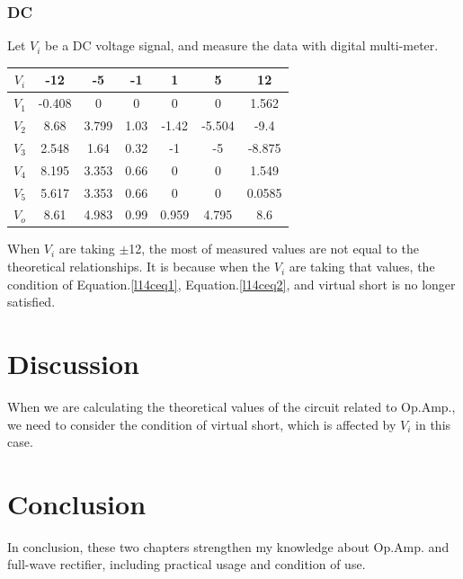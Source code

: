     \subsubsection{DC}
    Let $V_i$ be a DC voltage signal, and measure the data with digital multi-meter.\\
        \begin{table}[h]
        \centering
            \begin{tabular}{|c|c|c|c|c|c|c|}
            \hline
            $V_i$ & -12    & -5    & -1   & 1     & 5      & 12     \\ \hline
            $V_1$ & -0.408 & 0     & 0    & 0     & 0      & 1.562  \\ \hline
            $V_2$ & 8.68   & 3.799 & 1.03 & -1.42 & -5.504 & -9.4   \\ \hline
            $V_3$ & 2.548  & 1.64  & 0.32 & -1    & -5     & -8.875 \\ \hline
            $V_4$ & 8.195  & 3.353 & 0.66 & 0     & 0      & 1.549  \\ \hline
            $V_5$ & 5.617  & 3.353 & 0.66 & 0     & 0      & 0.0585 \\ \hline
            $V_o$ & 8.61   & 4.983 & 0.99 & 0.959 & 4.795  & 8.6    \\ \hline
        \end{tabular}
        \end{table}
        \FloatBarrier
    When $V_i$ are taking $\pm$12, the most of measured values are not equal to the theoretical relationships. It is because when the $V_i$ are taking that values, the condition of Equation.\ref{l14ceq1}, Equation.\ref{l14ceq2}, and virtual short is no longer satisfied.
    
\section{Discussion}
    When we are calculating the theoretical values of the circuit related to Op.Amp., we need to consider the condition of virtual short, which is affected by $V_i$ in this case.

\section{Conclusion}
    In conclusion, these two chapters strengthen my knowledge about Op.Amp. and full-wave rectifier, including practical usage and condition of use.